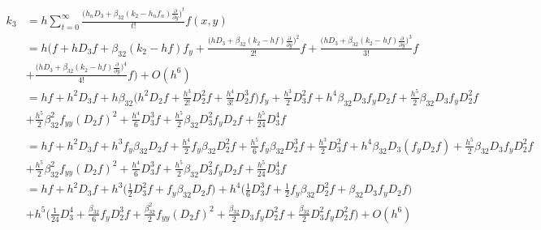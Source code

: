 \documentclass[12 pt]{article}
\begin{document}
{
\large
\begin{equation}
\begin{split}
k_{3} &= h\sum_{t=0}^{\infty}\frac{\bigg(h_{n}D_{3}+\beta_{32}(k_{2}-h_{n}f_{n})\frac{\partial}{\partial y}\bigg)^{t}}{t!}f(x,y)\\
	  &= h\bigg(f + hD_{3}f + \beta_{32}(k_{2}-hf)f_{y} + \frac{\bigg(hD_{3}+\beta_{32}(k_{2}-hf)\frac{\partial}{\partial y}\bigg)^{2}}{2!}f + \frac{\bigg(hD_{3}+\beta_{32}(k_{2}-hf)\frac{\partial}{\partial y}\bigg)^{3}}{3!}f \\
	  &+\frac{\bigg(hD_{3}+\beta_{32}(k_{2}-hf)\frac{\partial}{\partial y}\bigg)^{4}}{4!}f\bigg) + O(h^{6}) \\
	  &= hf + h^{2}D_{3}f + h\beta_{32}\bigg( h^{2}D_{2}f + \frac{h^{3}}{2!}D_{2}^{2}f + \frac{h^{4}}{3!}D_{2}^{3}f\bigg)f_{y} + \frac{h^{3}}{2}D_{3}^{2}f + h^{4}\beta_{32}D_{3}f_{y}D_{2}f + \frac{h^{5}}{2}\beta_{32}D_{3}f_{y}D_{2}^{2}f \\
	  &+ \frac{h^{5}}{2}\beta_{32}^{2}f_{yy}(D_{2}f)^{2} + \frac{h^{4}}{6}D_{3}^{3}f + \frac{h^{5}}{2}\beta_{32}D_{3}^{2}f_{y}D_{2}f + \frac{h^{5}}{24}D_{3}^{4}f\\
	  &\\
	  &= hf + h^{2}D_{3}f + h^{3}f_{y}\beta_{32}D_{2}f + \frac{h^{4}}{2}f_{y}\beta_{32}D_{2}^{2}f + \frac{h^{5}}{6}f_{y}\beta_{32}D_{2}^{3}f + \frac{h^{3}}{2}D_{3}^{2}f + h^{4}\beta_{32}D_{3}(f_{y}D_{2}f) + \frac{h^{5}}{2}\beta_{32}D_{3}f_{y}D_{2}^{2}f\\
	  &+ \frac{h^{5}}{2}\beta_{32}^{2}f_{yy}(D_{2}f)^{2} + \frac{h^{4}}{6}D_{3}^{3}f + \frac{h^{5}}{2}\beta_{32}D_{3}^{2}f_{y}D_{2}f + \frac{h^{5}}{24}D_{3}^{4}f\\
	  &= hf + h^{2}D_{3}f + h^{3}\bigg(\frac{1}{2}D_{3}^{2}f + f_{y}\beta_{32}D_{2}f\bigg) + h^{4}\bigg(\frac{1}{6}D_{3}^{3}f + \frac{1}{2}f_{y}\beta_{32}D_{2}^{2}f + \beta_{32}D_{3}f_{y}D_{2}f\bigg) \\
	  &+ h^{5}\bigg(\frac{1}{24}D^{4}_{3} + \frac{\beta_{32}}{6}f_{y}D_{2}^{3}f + \frac{\beta_{32}^{2}}{2}f_{yy}(D_{2}f)^{2} + \frac{\beta_{32}}{2}D_{3}f_{y}D_{2}^{2}f + \frac{\beta_{32}}{2}D_{3}^{2}f_{y}D_{2}^{2}f\bigg) + O(h^{6})
\end{split}
\end{equation}
}
\end{document}
